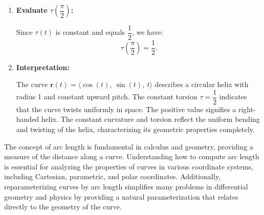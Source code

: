 \begin{example}
\begin{solution}
\begin{enumerate}
    Compute the magnitude:
    \[
    \left| \mathbf{r}'(t) \times \mathbf{r}''(t) \right| = \sqrt{ \sin^2(t) + \cos^2(t) + 1^2 } = \sqrt{1 + 1} = \sqrt{2}.
    \]

    Compute the dot product \( \left( \mathbf{r}'(t) \times \mathbf{r}''(t) \right) \cdot \mathbf{r}'''(t) \):
    \[
    \begin{aligned}
    \left( \mathbf{r}'(t) \times \mathbf{r}''(t) \right) \cdot \mathbf{r}'''(t) &= \langle \sin(t),\ -\cos(t),\ 1 \rangle \cdot \langle \sin(t),\ -\cos(t),\ 0 \rangle \\
    &= \sin^2(t) + (-\cos(t))^2 + 1 \cdot 0 \\
    &= \sin^2(t) + \cos^2(t) + 0 = 1.
    \end{aligned}
    \]

    Therefore, the torsion is:
    \[
    \tau(t) = \frac{1}{ \left( \sqrt{2} \right)^2 } = \frac{1}{2}.
    \]

    \item \textbf{Evaluate \( \tau\left( \dfrac{\pi}{2} \right) \):}

    Since \( \tau(t) \) is constant and equals \( \dfrac{1}{2} \), we have:
    \[
    \tau\left( \dfrac{\pi}{2} \right) = \frac{1}{2}.
    \]

    \item \textbf{Interpretation:}

    The curve \( \mathbf{r}(t) = \langle \cos(t),\ \sin(t),\ t \rangle \) describes a circular helix with radius 1 and constant upward pitch. The constant torsion \( \tau = \dfrac{1}{2} \) indicates that the curve twists uniformly in space. The positive value signifies a right-handed helix. The constant curvature and torsion reflect the uniform bending and twisting of the helix, characterizing its geometric properties completely.
\end{enumerate}
\end{solution}
\end{example}
\exampleline





\newpage


  

\noindent The concept of arc length is fundamental in calculus and geometry, providing a measure of the distance along a curve. Understanding how to compute arc length is essential for analyzing the properties of curves in various coordinate systems, including Cartesian, parametric, and polar coordinates. Additionally, reparameterizing curves by arc length simplifies many problems in differential geometry and physics by providing a natural parameterization that relates directly to the geometry of the curve.

